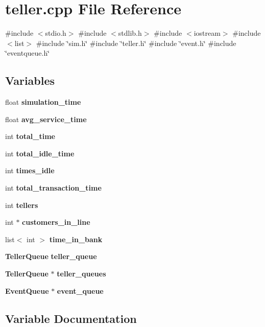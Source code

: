 \section{teller.\+cpp File Reference}
\label{teller_8cpp}
{\ttfamily \#include $<$stdio.\+h$>$}\newline
{\ttfamily \#include $<$stdlib.\+h$>$}\newline
{\ttfamily \#include $<$iostream$>$}\newline
{\ttfamily \#include $<$list$>$}\newline
{\ttfamily \#include \char`\"{}sim.\+h\char`\"{}}\newline
{\ttfamily \#include \char`\"{}teller.\+h\char`\"{}}\newline
{\ttfamily \#include \char`\"{}event.\+h\char`\"{}}\newline
{\ttfamily \#include \char`\"{}eventqueue.\+h\char`\"{}}\newline
\subsection*{Variables}
\begin{DoxyCompactItemize}
\item 
float \textbf{ simulation\+\_\+time}
\item 
float \textbf{ avg\+\_\+service\+\_\+time}
\item 
int \textbf{ total\+\_\+time}
\item 
int \textbf{ total\+\_\+idle\+\_\+time}
\item 
int \textbf{ times\+\_\+idle}
\item 
int \textbf{ total\+\_\+transaction\+\_\+time}
\item 
int \textbf{ tellers}
\item 
int $\ast$ \textbf{ customers\+\_\+in\+\_\+line}
\item 
list$<$ int $>$ \textbf{ time\+\_\+in\+\_\+bank}
\item 
\textbf{ Teller\+Queue} \textbf{ teller\+\_\+queue}
\item 
\textbf{ Teller\+Queue} $\ast$ \textbf{ teller\+\_\+queues}
\item 
\textbf{ Event\+Queue} $\ast$ \textbf{ event\+\_\+queue}
\end{DoxyCompactItemize}


\subsection{Variable Documentation}
\mbox{\label{teller_8cpp_a210f77aba17cfc74d1447f45e99be1bd}} 
